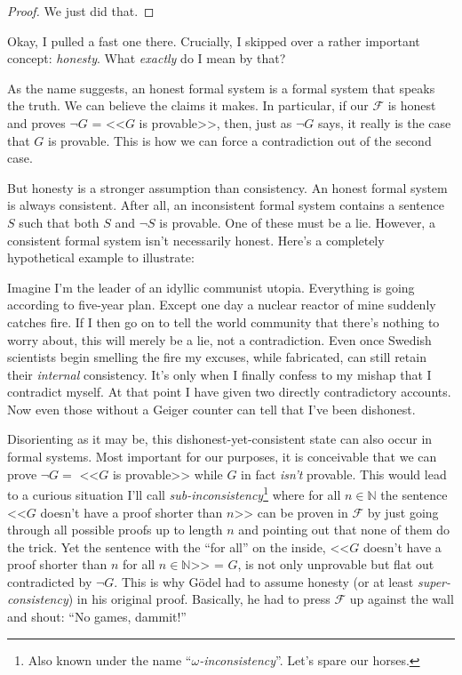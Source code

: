\documentclass{article}
\theoremstyle{customstyle}
\newcommand{\F}{\ensuremath{\mathcal{F}}}
\begin{document}
\begin{proof}
We just did that.
\end{proof}

Okay, I pulled a fast one there. Crucially, I skipped over a rather important concept: \textit{honesty}. What \textit{exactly} do I mean by that?

As the name suggests, an honest formal system is a formal system that speaks the truth. We can believe the claims it makes. In particular, if our $\F$ is honest and proves $\neg G$ = <<$G$ is provable>>, then, just as $\neg G$ says, it really is the case that $G$ is provable. This is how we can force a contradiction out of the second case.

But honesty is a stronger assumption than consistency. An honest formal system is always consistent. After all, an inconsistent formal system contains a sentence $S$ such that both $S$ and $\neg S$ is provable. One of these must be a lie. However, a consistent formal system isn't necessarily honest. Here's a completely hypothetical example to illustrate: 

Imagine I'm the leader of an idyllic communist utopia. Everything is going according to five-year plan. Except one day a nuclear reactor of mine suddenly catches fire. If I then go on to tell the world community that there's nothing to worry about, this will merely be a lie, not a contradiction. Even once Swedish scientists begin smelling the fire my excuses, while fabricated, can still retain their \textit{internal} consistency. It's only when I finally confess to my mishap that I contradict myself. At that point I have given two directly contradictory accounts. Now even those without a Geiger counter can tell that I've been dishonest.

Disorienting as it may be, this dishonest-yet-consistent state can also occur in formal systems. Most important for our purposes, it is conceivable that we can prove $\neg G =$ <<$G$ is provable>> while $G$ in fact \textit{isn't} provable. This would lead to a curious situation I'll call \textit{sub-inconsistency}\footnote{Also known under the name ``\textit{$\omega$-inconsistency}''. Let's spare our horses.} where for all $n\in\mathbb{N}$ the sentence <<$G$ doesn't have a proof shorter than $n$>> can be proven in $\F$ by just going through all possible proofs up to length $n$ and pointing out that none of them do the trick. Yet the sentence with the ``for all'' on the inside, <<$G$ doesn't have a proof shorter than $n$ for all $n\in\mathbb{N}$>> = $G$, is not only unprovable but flat out contradicted by $\neg G$. This is why Gödel had to assume honesty (or at least \textit{super-consistency}) in his original proof. Basically, he had to press $\F$ up against the wall and shout: ``No games, dammit!''
\end{document}
